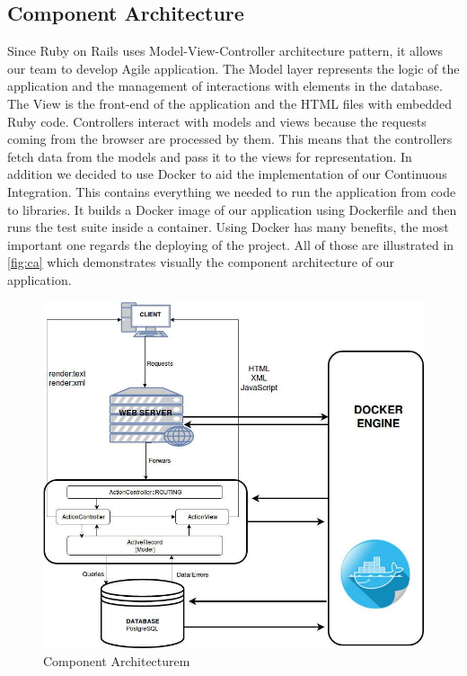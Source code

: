 \documentclass{l3proj}
\begin{document}
\subsection{Component Architecture}
\label{sec:component}

Since Ruby on Rails uses Model-View-Controller architecture pattern, it allows our team to develop Agile application. The Model layer represents the logic of the application and the management of interactions with elements in the database. The View is the front-end of the application and the HTML files with embedded Ruby code. Controllers interact with models and views because the requests coming from the browser are processed by them. This means that the controllers fetch data from the models and pass it to the views for representation.
In addition we decided to use Docker \cite{Docker} to aid the implementation of our Continuous Integration. This contains everything we needed to run the application from code to libraries. It builds a Docker image of our application using Dockerfile and then runs the test suite inside a container. Using Docker has many benefits, the most important one regards the deploying of the project.
All of those are illustrated in \autoref{fig:ca} which demonstrates visually the component architecture of our application.

\begin{figure}[h]
\centerline{\includegraphics[width=\textwidth, height=\textheight, keepaspectratio]{component.png}}
\caption{Component Architecturem}
\label{fig:ca}
\end{figure}
\end{document}
